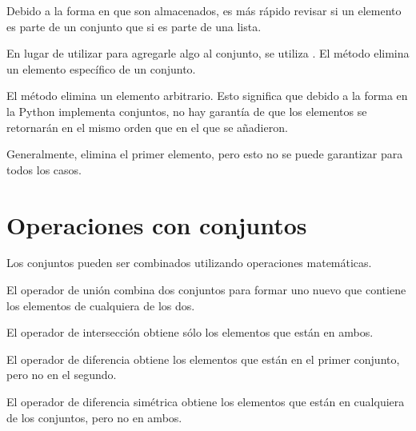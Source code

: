 
Debido a la forma en que son almacenados, es más rápido revisar si un elemento es parte de un conjunto que si es parte de una lista.

En lugar de utilizar  para agregarle algo al conjunto, se utiliza .
El método  elimina un elemento específico de un conjunto.


El método  elimina un elemento arbitrario.
Esto significa que debido a la forma en la Python implementa conjuntos, no hay garantía de que los elementos se retornarán en el mismo orden que en el que se añadieron.

Generalmente, elimina el primer elemento, pero esto no se puede garantizar para todos los casos.


\section{Operaciones con conjuntos}

Los conjuntos pueden ser combinados utilizando operaciones matemáticas.

El operador de unión \ttt{|} combina dos conjuntos para formar uno nuevo que contiene los elementos de cualquiera de los dos.


El operador de intersección \ttt{\&} obtiene sólo los elementos que están en ambos.


El operador de diferencia \ttt{-} obtiene los elementos que están en el primer conjunto, pero no en el segundo.


El operador de diferencia simétrica \ttt{\^} obtiene los elementos que están en cualquiera de los conjuntos, pero no en ambos.


